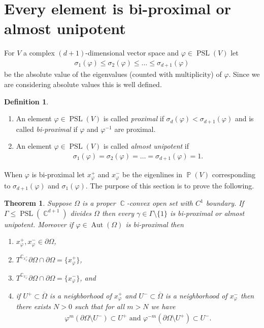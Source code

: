 \documentclass[12pt]{amsart}
\theoremstyle{plain}
\newtheorem{theorem}[proposition]{Theorem}
\theoremstyle{definition}
\newtheorem{definition}[proposition]{Definition}
\theoremstyle{remark}
\begin{document}
\section{Every element is bi-proximal or almost unipotent}\label{sec:bi_prox_or_unip}

For $V$ a complex $(d+1)$-dimensional vector space and $\varphi \in \operatorname{PSL}(V)$ let
\begin{align*}
\sigma_1(\varphi) \leq \sigma_2(\varphi) \leq \dots \leq \sigma_{d+1}(\varphi)
\end{align*}
be the absolute value of the eigenvalues (counted with multiplicity) of $\varphi$. Since we are considering absolute values this is well defined. 

\begin{definition} \
\begin{enumerate}
\item An element $\varphi \in \operatorname{PSL}(V)$ is called \emph{proximal} if $\sigma_{d}(\varphi) < \sigma_{d+1}(\varphi)$ and is called \emph{bi-proximal} if $\varphi$ and $\varphi^{-1}$ are proximal. 
\item An element $\varphi \in \operatorname{PSL}(V)$ is called \emph{almost unipotent} if 
\begin{align*}
\sigma_1(\varphi) = \sigma_2(\varphi) = \dots = \sigma_{d+1}(\varphi)=1.
\end{align*}
\end{enumerate}
\end{definition}

When $\varphi$ is bi-proximal let $x^+_{\varphi}$ and $x^-_{\varphi}$ be the eigenlines in $\operatorname{\mathbb{P}}(V)$ corresponding to $\sigma_{d+1}(\varphi)$ and $\sigma_1(\varphi)$.  
The purpose of this section is to prove the following.

\begin{theorem}
\label{thm:bi_prox}
Suppose $\Omega$ is a proper $\operatorname{\mathbb{C}}$-convex open set with $C^1$ boundary. If $\Gamma \leq \operatorname{PSL}(\operatorname{\mathbb{C}}^{d+1})$ divides $\Omega$ then every $\gamma \in \Gamma \setminus \{1\}$ is bi-proximal or almost unipotent. Moreover if $\varphi \in \operatorname{Aut}(\Omega)$ is bi-proximal then 
\begin{enumerate}
\item $x_{\varphi}^+,x_{\varphi}^- \in \partial \Omega$, 
\item $T^\operatorname{\mathbb{C}}_{x_{\varphi}^+} \partial \Omega \cap \partial \Omega = \{ x_{\varphi}^+\}$,
\item $T^\operatorname{\mathbb{C}}_{x_{\varphi}^-} \partial \Omega \cap \partial \Omega = \{ x_{\varphi}^-\}$, and
\item if $U^+ \subset \overline{\Omega}$ is a neighborhood of $x^+_{\varphi}$ and $U^- \subset \overline{ \Omega}$ is a neighborhood of $x^-_{\varphi}$ then there exists $N>0$ such that for all $m > N$ we have
\begin{align*}
\varphi^m(\partial \Omega \setminus U^-) \subset U^+ \text{ and } \varphi^{-m}(\partial \Omega \setminus U^+) \subset U^-.
\end{align*}
\end{enumerate}
\end{theorem}
\end{document}
